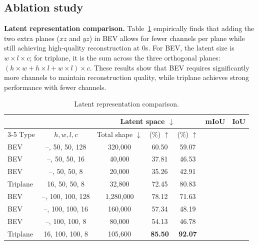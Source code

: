 \documentclass[11pt,a4paper]{article}
\begin{document}
\subsection{Ablation study}

\textbf{Latent representation comparison.}
Table~\ref{tab:latent} empirically finds that adding the two extra planes ($xz$ and $yz$) in BEV allows for fewer channels per plane while still achieving high-quality reconstruction at 0s.
For BEV, the latent size is $w \times l \times c$; for triplane, it is the sum across the three orthogonal planes: $(h \times w + h \times l + w \times l) \times c$.
These results show that BEV requires significantly more channels to maintain reconstruction quality, while triplane achieves strong performance with fewer channels.

\begin{table}[htbp]
  \centering
  \caption{Latent representation comparison.}
  \label{tab:latent}
  \begin{tabular}{lcccccc}
    \toprule
    & & \multicolumn{3}{c}{Latent space $\downarrow$} & mIoU & IoU \\
    \cmidrule(lr){3-5}
    Type & $h, w, l, c$ & Total shape $\downarrow$ & (\%) $\uparrow$ & (\%) $\uparrow$ \\
    \midrule
    BEV      & --, 50, 50, 128 & 320,000   & 60.50 & 59.07 \\
    BEV      & --, 50, 50, 16  & 40,000    & 37.81 & 46.53 \\
    BEV      & --, 50, 50, 8   & 20,000    & 35.26 & 42.91 \\
    Triplane & 16, 50, 50, 8   & 32,800    & 72.45 & 80.83 \\
    \midrule
    BEV      & --, 100, 100, 128 & 1,280,000 & 78.12 & 71.63 \\
    BEV      & --, 100, 100, 16  & 160,000   & 57.34 & 48.19 \\
    BEV      & --, 100, 100, 8   & 80,000    & 54.13 & 46.78 \\
    Triplane & 16, 100, 100, 8   & 105,600   & \textbf{85.50} & \textbf{92.07} \\
    \bottomrule
  \end{tabular}
\end{table}
\end{document}
